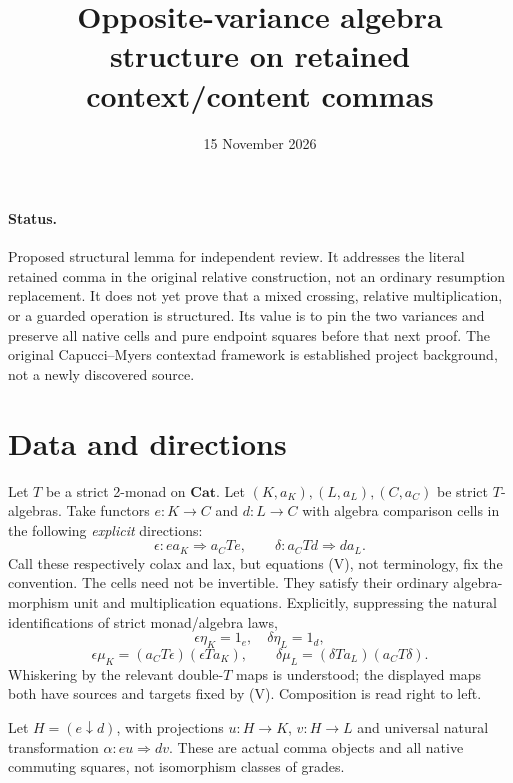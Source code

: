 \documentclass[11pt]{article}
\title{Opposite-variance algebra structure on retained context/content commas}
\date{15 November 2026}
\begin{document}
\maketitle
\paragraph{Status.} Proposed structural lemma for independent review. It addresses the literal retained comma in the original relative construction, not an ordinary resumption replacement. It does not yet prove that a mixed crossing, relative multiplication, or a guarded operation is structured. Its value is to pin the two variances and preserve all native cells and pure endpoint squares before that next proof. The original Capucci--Myers contextad framework is established project background, not a newly discovered source.

\section{Data and directions}
Let $T$ be a strict 2-monad on $\mathbf{Cat}$. Let $(K,a_K),(L,a_L),(C,a_C)$ be strict $T$-algebras. Take functors $e:K\to C$ and $d:L\to C$ with algebra comparison cells in the following \emph{explicit} directions:
\[
 \epsilon:e a_K\Rightarrow a_C T e,
 \qquad \delta:a_C T d\Rightarrow d a_L.
\tag{V}
\]
Call these respectively colax and lax, but equations (V), not terminology, fix the convention. The cells need not be invertible. They satisfy their ordinary algebra-morphism unit and multiplication equations. Explicitly, suppressing the natural identifications of strict monad/algebra laws,
\[
 \epsilon\eta_K=1_e,\quad \delta\eta_L=1_d,
\]
\[
 \epsilon\mu_K=(a_C T\epsilon)(\epsilon T a_K),\qquad
 \delta\mu_L=(\delta T a_L)(a_C T\delta).
\tag{A}
\]
Whiskering by the relevant double-$T$ maps is understood; the displayed maps both have sources and targets fixed by (V). Composition is read right to left.

Let $H=(e\downarrow d)$, with projections $u:H\to K$, $v:H\to L$ and universal natural transformation $\alpha:eu\Rightarrow dv$. These are actual comma objects and all native commuting squares, not isomorphism classes of grades.
\end{document}
